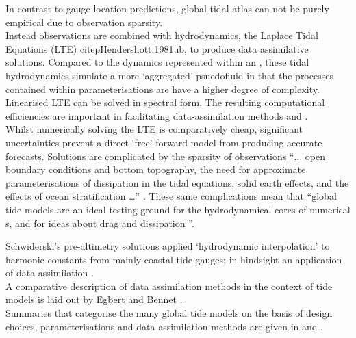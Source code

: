 
In contrast to gauge-location predictions, global tidal atlas can not be purely empirical due to observation sparsity.\\
Instead observations are combined with hydrodynamics, the Laplace Tidal Equations (LTE) \citep[9.8]{gill1982atmosphere}citep{Hendershott:1981ub}, to produce data assimilative solutions.   
Compared to the dynamics represented within an \OGCM{}, these tidal hydrodynamics simulate a more `aggregated' psuedofluid in that the processes contained within parameterisations are have a higher degree of complexity.\\

Linearised LTE can be solved in spectral form.  The resulting computational efficiencies are important in facilitating data-assimilation methods \cite[pp184]{Egbert:2002ug} and \cite[pp395]{Lyard:2006ir}.\\


Whilst numerically solving the LTE is comparatively cheap, significant uncertainties prevent a direct `free' forward model from producing accurate forecasts. 
Solutions are complicated by the sparsity of observations ``$\dots$ open boundary conditions and bottom topography, the need for approximate parameterisations of dissipation in the tidal equations, solid earth effects, and the effects of ocean stratification \dots{}'' \citep[183]{Egbert:2002ug}. These same complications mean that ``global tide models are an ideal testing ground for the hydrodynamical cores of numerical \OGCM{}s, and for ideas about drag and dissipation ''\citep{Arbic:2004wz}.




Schwiderski's pre-altimetry solutions applied `hydrodynamic interpolation' to harmonic constants from mainly coastal tide gauges;  in hindsight an application of data assimilation \cite[pp822]{Egbert:1994wz}.\\
A comparative description of data assimilation methods in the context of tide models is laid out by Egbert and Bennet \cite{Egbert:1996vr}.\\   
Summaries that categorise the many global tide models on the basis of design choices, parameterisations and data assimilation methods are given in \cite{Ardalan:2008gs} and \cite{Matsumoto:2000tg}. \\



